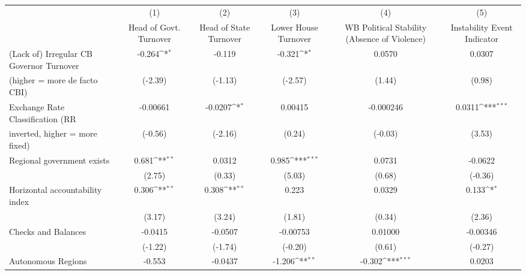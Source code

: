 {
\def\sym#1{\ifmmode^{#1}\else\(^{#1}\)\fi}
\begin{tabular}{l*{5}{c}}
\toprule
                                        &\multicolumn{1}{c}{(1)}&\multicolumn{1}{c}{(2)}&\multicolumn{1}{c}{(3)}&\multicolumn{1}{c}{(4)}&\multicolumn{1}{c}{(5)}\\
                                        &\multicolumn{1}{c}{Head of Govt. Turnover}&\multicolumn{1}{c}{Head of State Turnover}&\multicolumn{1}{c}{Lower House Turnover}&\multicolumn{1}{c}{WB Political Stability (Absence of Violence)}&\multicolumn{1}{c}{Instability Event Indicator}\\
\midrule
(Lack of) Irregular CB Governor Turnover&    -0.264\sym{*}  &    -0.119         &    -0.321\sym{*}  &    0.0570         &    0.0307         \\
(higher = more de facto CBI)            &   (-2.39)         &   (-1.13)         &   (-2.57)         &    (1.44)         &    (0.98)         \\
\addlinespace
Exchange Rate Classification (RR        &  -0.00661         &   -0.0207\sym{*}  &   0.00415         & -0.000246         &    0.0311\sym{***}\\
inverted, higher = more fixed)          &   (-0.56)         &   (-2.16)         &    (0.24)         &   (-0.03)         &    (3.53)         \\
\addlinespace
Regional government exists              &     0.681\sym{**} &    0.0312         &     0.985\sym{***}&    0.0731         &   -0.0622         \\
                                        &    (2.75)         &    (0.33)         &    (5.03)         &    (0.68)         &   (-0.36)         \\
\addlinespace
Horizontal accountability index         &     0.306\sym{**} &     0.308\sym{**} &     0.223         &    0.0329         &     0.133\sym{*}  \\
                                        &    (3.17)         &    (3.24)         &    (1.81)         &    (0.34)         &    (2.36)         \\
\addlinespace
Checks and Balances                     &   -0.0415         &   -0.0507         &  -0.00753         &   0.01000         &  -0.00346         \\
                                        &   (-1.22)         &   (-1.74)         &   (-0.20)         &    (0.61)         &   (-0.27)         \\
\addlinespace
Autonomous Regions                      &    -0.553         &   -0.0437         &    -1.206\sym{**} &    -0.302\sym{***}&    0.0203         \\

\end{tabular}}
